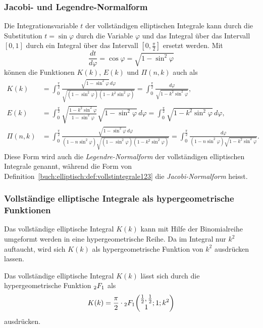 \subsubsection{Jacobi- und Legendre-Normalform}
Die Integrationsvariable $t$ der vollständigen elliptischen Integrale
kann durch die Substitution $t=\sin\varphi$ durch die Variable
$\varphi$ und das Integral über das Intervall $[0,1]$ durch ein
Integral über das Intervall $[0,\frac{\pi}2]$ ersetzt werden.
Mit
\[
\frac{dt}{d\varphi} = \cos\varphi = \sqrt{1-\sin^2\varphi}
\]
können die Funktionen $K(k)$, $E(k)$ und $\Pi(n,k)$ auch als
\begin{align*}
K(k)
&=
\int_0^{\frac{\pi}2}
\frac{
\sqrt{1-\sin^2\varphi}\,d\varphi
}{
\sqrt{(1-\sin^2\varphi)(1-k^2\sin^2\varphi)}
}
=
\int_0^{\frac{\pi}2}
\frac{d\varphi}{\sqrt{1-k^2\sin^2\varphi}}
,
\\
E(k)
&=
\int_0^{\frac{\pi}2}
\sqrt{\frac{1-k^2\sin^2\varphi}{1-\sin^2\varphi}}\sqrt{1-\sin^2\varphi}\,d\varphi
=
\int_0^{\frac{\pi}2}
\sqrt{1-k^2\sin^2\varphi}\,d\varphi
,
\\
\Pi(n,k)
&=
\int_0^{\frac{\pi}2}
\frac{
\sqrt{1-\sin^2\varphi}\,d\varphi
}{
(1-n\sin^2\varphi)\sqrt{(1-\sin^2\varphi)(1-k^2\sin^2\varphi)}
}
=
\int_0^{\frac{\pi}2}
\frac{
d\varphi
}{
(1-n\sin^2\varphi)\sqrt{1-k^2\sin^2\varphi}
}
.
\end{align*}
Diese Form wird auch die {\em Legendre-Normalform} der vollständigen 
%
elliptischen Integrale genannt, während die Form von
Definition~\ref{buch:elliptisch:def:vollstintegrale123}
die {\em Jacobi-Normalform} heisst.
%

\subsubsection{Vollständige elliptische Integrale als hypergeometrische
Funktionen}
Das vollständige elliptische Integral $K(k)$ kann mit Hilfe der 
Binomialreihe umgeformt werden in eine hypergeometrische Reihe.
Da im Integral nur $k^2$ auftaucht, wird sich $K(k)$ als
hypergeometrische Funktion von $k^2$ ausdrücken lassen.

\begin{satz}
\label{buch:elliptisch:satz:hyperK}
Das vollständige elliptische Integral $K(k)$ lässt sich durch die
hypergeometrische Funktion $\mathstrut_2F_1$ als
\[
K(k)
=
\frac{\pi}2
\cdot
\mathstrut_2F_1\biggl(
\begin{matrix}\frac12,\frac12\\1\end{matrix};1;k^2
\biggr)
\]
ausdrücken.
\end{satz}


